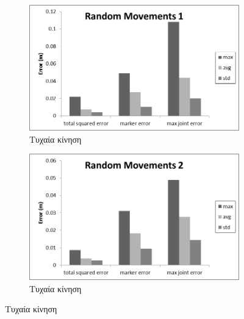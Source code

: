 \begin{figure}[H]
    \begin{subfigure}[t]{.48\textwidth}
        \includegraphics[width=\textwidth, keepaspectratio]{fig/ik-reg3.png}
        \caption{Τυχαία κίνηση}
        \label{fig:random-walk1}
    \end{subfigure}
    \begin{subfigure}[t]{.48\textwidth}
        \includegraphics[width=\textwidth, keepaspectratio]{fig/ik-reg4.png}
        \caption{Τυχαία κίνηση}
        \label{fig:random-walk1}
    \end{subfigure}


\end{figure}
